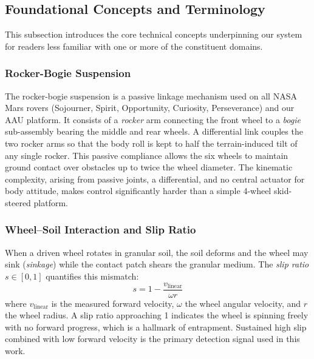 \documentclass[12pt,a4paper]{article}
\begin{document}
\subsection{Foundational Concepts and Terminology}

This subsection introduces the core technical concepts underpinning our system for readers less familiar with one or more of the constituent domains.

\subsubsection*{Rocker-Bogie Suspension}
The rocker-bogie suspension is a passive linkage mechanism used on all NASA Mars rovers (Sojourner, Spirit, Opportunity, Curiosity, Perseverance) and our AAU platform. It consists of a \textit{rocker} arm connecting the front wheel to a \textit{bogie} sub-assembly bearing the middle and rear wheels. A differential link couples the two rocker arms so that the body roll is kept to half the terrain-induced tilt of any single rocker. This passive compliance allows the six wheels to maintain ground contact over obstacles up to twice the wheel diameter. The kinematic complexity, arising from passive joints, a differential, and no central actuator for body attitude, makes control significantly harder than a simple 4-wheel skid-steered platform.

\subsubsection*{Wheel--Soil Interaction and Slip Ratio}
When a driven wheel rotates in granular soil, the soil deforms and the wheel may sink (\textit{sinkage}) while the contact patch shears the granular medium. The \textit{slip ratio} $s \in [0, 1]$ quantifies this mismatch:
\begin{equation}
    s = 1 - \frac{v_{\text{linear}}}{\omega r}
\end{equation}
where $v_{\text{linear}}$ is the measured forward velocity, $\omega$ the wheel angular velocity, and $r$ the wheel radius. A slip ratio approaching 1 indicates the wheel is spinning freely with no forward progress, which is a hallmark of entrapment. Sustained high slip combined with low forward velocity is the primary detection signal used in this work.
\end{document}
